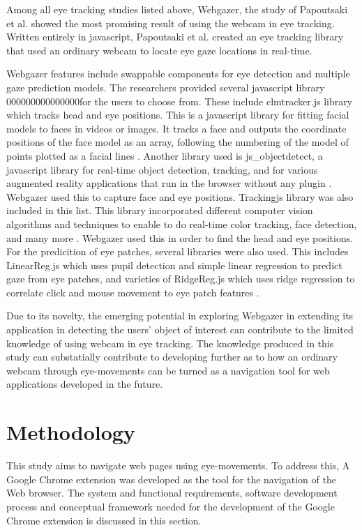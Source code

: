\documentclass[journal]{./IEEE/IEEEtran}
\begin{document}
Among all eye tracking studies listed above, Webgazer, the study of Papoutsaki et al.  \cite{papoutsaki2016webgazer} showed the most promising result of using the webcam in eye tracking. Written entirely in javascript, Papoutsaki et al. created an eye tracking library that used an ordinary webcam to locate eye gaze locations in real-time.

Webgazer features include swappable components for eye detection and multiple gaze prediction models. The researchers provided several javascript library 000000000000000for the users to choose from. These include clmtracker.js library which  tracks head and eye positions. This is a javascript library for fitting facial models to faces in videos or images. It tracks a face and outputs the coordinate positions of the face model as an array, following the numbering of the model of points plotted as a facial lines \cite{auduno-clmtrackr}. Another library used is js\_objectdetect, a javascript library for real-time object detection, tracking,  and for various augmented reality applications that run in the browser without any plugin \cite{js-objectdetect}. Webgazer used this to capture face and eye positions. Trackingjs library was also included in this list. This library incorporated different computer vision algorithms and techniques to enable to do real-time color tracking, face detection,  and many more \cite{lundgren}. Webgazer used this in order to find the head and eye positions. For the predicition of eye patches, several libraries were also used. This includes LinearReg.js which uses pupil detection and simple linear regression to predict gaze from eye patches, and varieties of RidgeReg.js which uses ridge regression to correlate click and mouse movement to eye patch features  \cite{papoutsaki2016webgazer}.

Due to its novelty, the emerging potential in exploring Webgazer in extending its application in detecting the users’ object of interest can contribute to the limited knowledge of using webcam in eye tracking. The knowledge produced in this study can substatially  contribute to developing further as to how an ordinary webcam through eye-movements can be turned as a navigation tool for web applications developed in the future. 

\section {Methodology }

This study aims to navigate web pages using eye-movements. To address this, A Google Chrome extension was developed as the tool for the navigation of the Web browser. The system and functional requirements, software development process and conceptual framework needed for the development of the Google Chrome extension is discussed in this section. 
\end{document}
